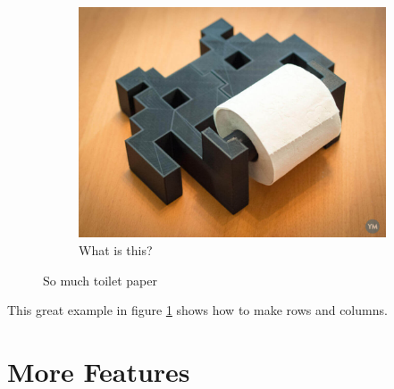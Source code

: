 \documentclass{article}
\begin{document}
\begin{figure}[H]
                    \begin{subfigure}[b]{0.7\linewidth}
                        \includegraphics[width=\linewidth]{large_Space_Invader_Print_preview_featured.jpg}
                        \caption{What is this?}
                    \end{subfigure}

                    \caption{So much toilet paper}
                    \label{fig:toilet_paper}
                \end{figure}
                This great example in figure \ref{fig:toilet_paper} shows how to make rows and columns. \autocite[1]{hunter_inside_2015}

    \section{More Features}
\end{document}
